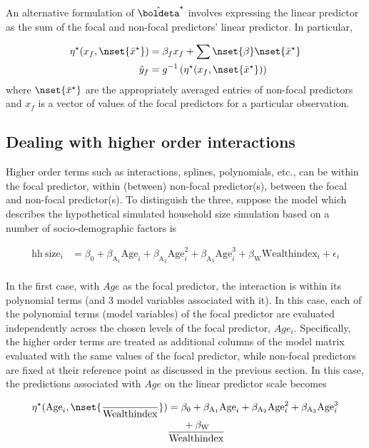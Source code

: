 An alternative formulation of $\hat{\boldeta}^\star$ involves expressing the linear predictor as the sum of the focal and non-focal predictors' linear predictor. In particular, 

\begin{align}\label{eq:eta_mean}
\eta^\star(x_f, \nset{{\bar{x}^\star}}) &= \beta_f x_f + \sum \nset{\beta} \nset{{\bar{x}^\star}} \\
\hat{y}_f  &= g^{-1} \left(\eta^\star(x_f, \nset{{\bar{x}^\star}})\right)
\end{align}
where $\nset{{\bar{x}^\star}}$ are the appropriately averaged entries of non-focal predictors and $x_f$ is a vector of values of the focal predictors for a particular observation.


\subsection*{Dealing with higher order interactions}

Higher order terms such as interactions, splines, polynomials, etc., can be within the focal predictor, within (between) non-focal predictor(s), between the focal and non-focal predictor(s). To distinguish the three, suppose the model which describes the hypothetical simulated household size simulation based on a number of socio-demographic factors is

\begin{align}\label{sim:lm_cubic}
\mathrm{hh~size}_i &= \beta_0 + \beta_{\mathrm{A_1}}\mathrm{Age}_i + \beta_{\mathrm{A_2}}\mathrm{Age}^2_i + \beta_{\mathrm{A_3}}\mathrm{Age}^3_i + \beta_{\mathrm{W}}\mathrm{Wealthindex}_i + \epsilon_i \nonumber\\
\end{align}

In the first case, with $Age$ as the focal predictor, the interaction is within its polynomial terms (and 3 model variables associated with it). In this case, each of the polynomial terms (model variables) of the focal predictor are evaluated independently across the chosen levels of the focal predictor, $Age_i$. Specifically, the higher order terms are treated as additional columns of the model matrix evaluated with the same values of the focal predictor, while non-focal predictors are fixed at their reference point as discussed in the previous section. In this case, the predictions associated with $Age$ on the linear predictor scale becomes

\begin{align*}
\eta^\star(\mathrm{Age}_i, \nset{{\over{\mathrm{Wealthindex}}}}) &= \beta_0 + \beta_{\mathrm{A_1}}\mathrm{Age}_i + \beta_{\mathrm{A_2}}\mathrm{Age}^2_i + \beta_{\mathrm{A_3}}\mathrm{Age}^3_i\\
	& + \beta_{\mathrm{W}}\over{\mathrm{Wealthindex}}
\end{align*}

